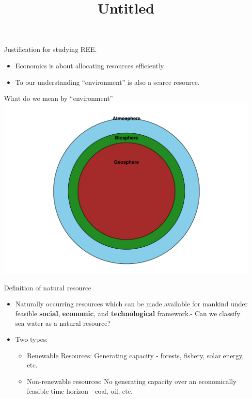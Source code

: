 \documentclass[
  ignorenonframetext,
]{beamer}
\title{Untitled}
\author{}
\date{}
\providecommand{\tightlist}{%
  \setlength{\itemsep}{0pt}\setlength{\parskip}{0pt}}\usepackage{longtable,booktabs,array}
\begin{document}
\frame{\titlepage}

\begin{frame}{Justification for studying REE.}
\label{justification-for-studying-ree.}
\begin{itemize}
\tightlist
\item
  Economics is about allocating resources efficiently.
\item
  To our understanding ``environment'' is also a scarce resource.
\end{itemize}
\end{frame}

\begin{frame}{What do we mean by ``environment''}
\label{what-do-we-mean-by-environment}
\includegraphics{intro_files/figure-beamer/unnamed-chunk-1-1.pdf}
\end{frame}

\begin{frame}{Definition of natural resource}
\label{definition-of-natural-resource}
\begin{itemize}
\item
  Naturally occurring resources which can be made available for mankind
  under feasible \textbf{social}, \textbf{economic}, and
  \textbf{technological} framework.- Can we classify sea water as a
  natural resource?
\item
  Two types:

  \begin{itemize}
  \tightlist
  \item
    Renewable Resources: Generating capacity - forests, fishery, solar
    energy, etc.
  \item
    Non-renewable resources: No generating capacity over an economically
    feasible time horizon - coal, oil, etc.
  \end{itemize}
\end{itemize}
\end{frame}
\end{document}
